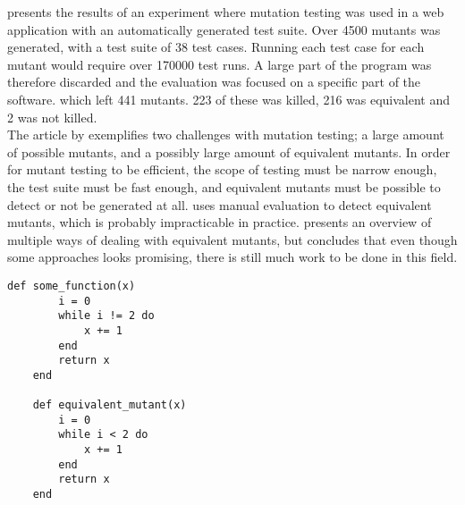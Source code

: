 \citet{article:mutation} presents the results of an experiment where
mutation testing was used in a web application with an automatically
generated test suite. Over 4500 mutants was generated, with a test suite
of 38 test cases. Running each test case for each mutant would require
over 170000 test runs. A large part of the program was therefore
discarded and the evaluation was focused on a specific part of the
software. which left 441 mutants. 223 of these was killed, 216 was
equivalent and 2 was not killed.\\

The article by \citeauthor{article:mutation} exemplifies two challenges
with mutation testing; a large amount of possible mutants, and a
possibly large amount of equivalent mutants. In order for mutant testing
to be efficient, the scope of testing must be narrow enough, the test
suite must be fast enough, and equivalent mutants must be possible to
detect or not be generated at all. \citeauthor{article:mutation} uses
manual evaluation to detect equivalent mutants, which is probably
impracticable in practice. \citet{article:eq_mutant} presents an
overview of multiple ways of dealing with equivalent mutants, but
concludes that even though some approaches looks promising, there is
still much work to be done in this field.\\

\begin{lstlisting}[caption=Example of a program with an equivalent mutant,
                   label=lst:mutation_eq, float=t]
    def some_function(x)
        i = 0
        while i != 2 do
            x += 1
        end
        return x
    end

    def equivalent_mutant(x)
        i = 0
        while i < 2 do
            x += 1
        end
        return x
    end
\end{lstlisting}
